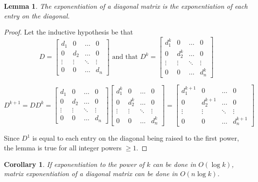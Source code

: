 \documentclass[11pt, oneside]{article}
\theoremstyle{plain}
\newtheorem{corollary}{Corollary}[theorem]
\newtheorem{lemma}[theorem]{Lemma}
\theoremstyle{definition}
\begin{document}
\begin{lemma}
The exponentiation of a diagonal matrix is the exponentiation
of each entry on the diagonal.
\end{lemma}
\begin{proof}
Let the inductive hypothesis be that \[ D = \begin{bmatrix}
  d_1 & 0 & \dots & 0 \\
  0 & d_2 & \dots & 0 \\
  \vdots & \vdots & \ddots & \vdots \\
  0 & 0 & \dots & d_n
\end{bmatrix}
\text{ and that }
D^k = \begin{bmatrix}
  d_1^k & 0 & \dots & 0 \\
  0 & d_2^k & \dots & 0 \\
  \vdots & \vdots & \ddots & \vdots \\
  0 & 0 & \dots & d_n^k
\end{bmatrix} \]

\[ D^{k + 1} = D D^k =
\begin{bmatrix}
  d_1 & 0 & \dots & 0 \\
  0 & d_2 & \dots & 0 \\
  \vdots & \vdots & \ddots & \vdots \\
  0 & 0 & \dots & d_n
\end{bmatrix}
\begin{bmatrix}
  d_1^k & 0 & \dots & 0 \\
  0 & d_2^k & \dots & 0 \\
  \vdots & \vdots & \ddots & \vdots \\
  0 & 0 & \dots & d_n^k
\end{bmatrix}
=
\begin{bmatrix}
  d_1^{k + 1} & 0 & \dots & 0 \\
  0 & d_2^{k + 1} & \dots & 0 \\
  \vdots & \vdots & \ddots & \vdots \\
  0 & 0 & \dots & d_n^{k + 1}
\end{bmatrix}
\]

Since \( D^1 \) is equal to each entry on the diagonal being raised
to the first power, the lemma is true for all integer powers \( \geq 1\).
\end{proof}

\begin{corollary}
If exponentiation to the power of \( k \) can be done in \( O(\log k) \),
matrix exponentiation of a diagonal matrix can be done in \( O(n \log k) \).
\end{corollary}
\end{document}
